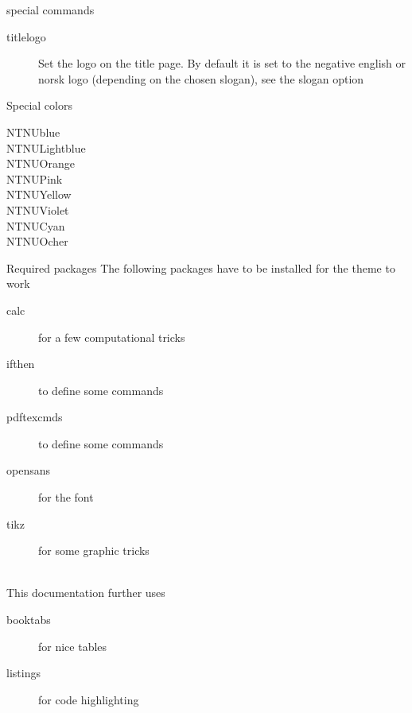 \documentclass[aspectratio=169]{beamer}
\begin{document}
	\begin{frame}{special commands}
		\begin{description}
			\item[titlelogo]
			Set the logo on the title page. By default it is set to the negative english or norsk logo (depending on the chosen slogan), see the slogan option
		\end{description}
	\end{frame}
	\begin{frame}{Special colors}
		\begin{description}
			\item[{\color{NTNUBlue} NTNUblue}]
			\item[{\color{NTNULightblue} NTNULightblue}]
			\item[{\color{NTNUOrange} NTNUOrange}]
			\item[{\color{NTNUPink} NTNUPink}]
			\item[{\color{NTNUYellow} NTNUYellow}]
			\item[{\color{NTNUViolet} NTNUViolet}]
			\item[{\color{NTNUCyan} NTNUCyan}]
			\item[{\color{NTNUOcher} NTNUOcher}]
		\end{description}
	\end{frame}
	\begin{frame}{Required packages}
		The following packages have to be installed for the theme to work
		\begin{description}
			\item[calc] for a few computational tricks
			\item[ifthen] to define some commands
			\item[pdftexcmds] to define some commands
			\item[opensans] for the font
			\item[tikz] for some graphic tricks
		\end{description}
		\ \\[\baselineskip]
		This documentation further uses
		\begin{description}
			\item[booktabs] for nice tables
			\item[listings] for code highlighting
		\end{description}
	\end{frame}
\end{document}
